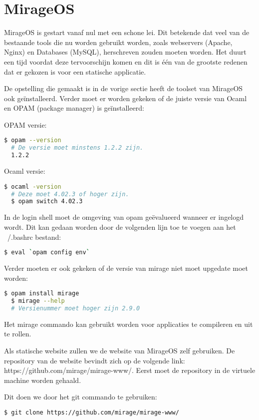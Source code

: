 \section{MirageOS}

MirageOS is gestart vanaf nul met een schone lei. Dit betekende dat veel van de bestaande tools die nu worden gebruikt worden, zoals webservers (Apache, Nginx) en Databases (MySQL), herschreven zouden moeten worden. Het duurt een tijd voordat deze tervoorschijn komen en dit is één van de grootste redenen dat er gekozen is voor een statische applicatie.

De opstelling die gemaakt is in de vorige sectie heeft de toolset van MirageOS ook geïnstalleerd. Verder moet er worden gekeken of de juiste versie van Ocaml en OPAM (package manager) is geïnstalleerd:

\noindent OPAM versie:
\begin{lstlisting}[language=bash]
  $ opam --version
  # De versie moet minstens 1.2.2 zijn.
  1.2.2
\end{lstlisting}

\noindent Ocaml versie:
\begin{lstlisting}[language=bash]
  $ ocaml -version
  # Deze moet 4.02.3 of hoger zijn.
  $ opam switch 4.02.3
\end{lstlisting}

In de login shell moet de omgeving van opam geëvalueerd wanneer er ingelogd wordt. Dit kan gedaan worden door de volgenden lijn toe te voegen aan het ~/.bashrc bestand:

\begin{lstlisting}[language=bash]
  $ eval `opam config env`
\end{lstlisting}

\noindent Verder moeten er ook gekeken of de versie van mirage niet moet upgedate moet worden:
\begin{lstlisting}[language=bash]
  $ opam install mirage
  $ mirage --help
  # Versienummer moet hoger zijn 2.9.0
\end{lstlisting}

Het mirage commando kan gebruikt worden voor applicaties te compileren en uit te rollen.

Als statische website zullen we de website van MirageOS zelf gebruiken. De repository van de website bevindt zich op de volgende link: https://github.com/mirage/mirage-www/. Eerst moet de repository in de virtuele machine worden gehaald. 

\noindent Dit doen we door het git commando te gebruiken:
\begin{lstlisting}[language=bash]
  $ git clone https://github.com/mirage/mirage-www/
\end{lstlisting}

